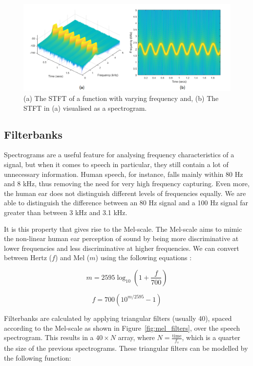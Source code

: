 \begin{figure}[ht]
    \centering
    \includegraphics[width=0.9\linewidth]{content/fig/spec_example.png}
    \caption{
    (a) The STFT of a function with varying frequency and, 
    (b) The STFT in (a) visualised as a spectrogram.
    }
    \label{fig:spec_example}
\end{figure}

\subsection{Filterbanks}

Spectrograms are a useful feature for analysing frequency characteristics of a signal, but when it comes to speech in particular, they still contain a lot of unnecessary information. 
Human speech, for instance, falls mainly within 80 Hz and 8 kHz, thus removing the need for very high frequency capturing. 
Even more, the human ear does not distinguish different levels of frequencies equally. 
We are able to distinguish the difference between an 80 Hz signal and a 100 Hz signal far greater than between 3 kHz and 3.1 kHz.

It is this property that gives rise to the Mel-scale. 
The Mel-scale aims to mimic the non-linear human ear perception of sound by being more discriminative at lower frequencies and less discriminative at higher frequencies. 
We can convert between Hertz ($f$) and Mel ($m$) using the following equations \cite{fayek_2016}:

\begin{equation}
    m = 2595 \log_{10} (1 + \frac{f}{700})
\end{equation}

\begin{equation}
    f = 700 (10^{m/2595} - 1)
\end{equation}

Filterbanks are calculated by applying triangular filters (usually 40), spaced according to the Mel-scale as shown in Figure~\ref{fig:mel_filters}, over the speech spectrogram. 
This results in a $40\times N$ array, where $N = \frac{\mathrm{time}}{f_s}$, which is a quarter the size of the previous spectrograms.
These triangular filters can be modelled by the following function:

